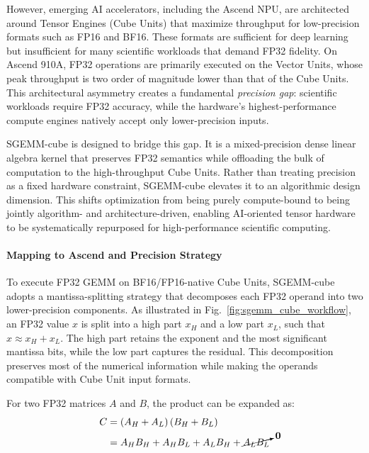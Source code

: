 \documentclass{article}
\begin{document}
However, emerging AI accelerators, including the Ascend NPU, are architected around Tensor Engines (Cube Units) that maximize throughput for low-precision formats such as FP16 and BF16. These formats are sufficient for deep learning but insufficient for many scientific workloads that demand FP32 fidelity. On Ascend 910A, FP32 operations are primarily executed on the Vector Units, whose peak throughput is two order of magnitude lower than that of the Cube Units. This architectural asymmetry creates a fundamental \emph{precision gap}: scientific workloads require FP32 accuracy, while the hardware’s highest-performance compute engines natively accept only lower-precision inputs.

SGEMM-cube is designed to bridge this gap. It is a mixed-precision dense linear algebra kernel that preserves FP32 semantics while offloading the bulk of computation to the high-throughput Cube Units. Rather than treating precision as a fixed hardware constraint, SGEMM-cube elevates it to an algorithmic design dimension. This shifts optimization from being purely compute-bound to being jointly algorithm- and architecture-driven, enabling AI-oriented tensor hardware to be systematically repurposed for high-performance scientific computing.

\paragraph{Mapping to Ascend and Precision Strategy}

To execute FP32 GEMM on BF16/FP16-native Cube Units, SGEMM-cube adopts a mantissa-splitting strategy that decomposes each FP32 operand into two lower-precision components. As illustrated in Fig.~\ref{fig:sgemm_cube_workflow}, an FP32 value $x$ is split into a high part $x_H$ and a low part $x_L$, such that $x \approx x_H + x_L$. The high part retains the exponent and the most significant mantissa bits, while the low part captures the residual. This decomposition preserves most of the numerical information while making the operands compatible with Cube Unit input formats.

For two FP32 matrices $A$ and $B$, the product can be expanded as:
\begin{equation}
\label{eq:sgemm_split}
\begin{aligned}
C &= (A_H + A_L)\,(B_H + B_L) \\
  &= A_H B_H 
   + A_H B_L 
   + A_L B_H 
   + \cancelto{\mathbf{0}}{A_L B_L}
\end{aligned}
\end{equation}
\end{document}
